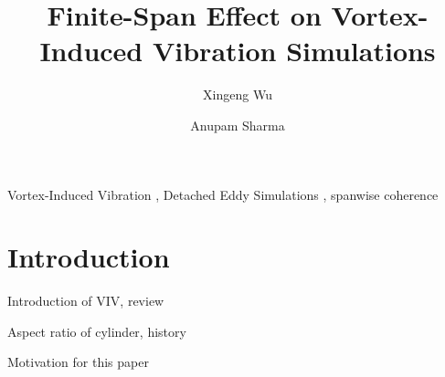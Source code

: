 \documentclass[12pt,preprint]{elsarticle}
\begin{document}
\begin{frontmatter}



\title{Finite-Span Effect on Vortex-Induced Vibration Simulations}


\author[1]{Xingeng Wu}
\author[2]{Anupam Sharma}

\address{Department of Aerospace Engineering, Iowa State University, Ames,
Iowa, 50011}



\begin{keyword}
  Vortex-Induced Vibration \sep 
  Detached Eddy Simulations \sep 
  spanwise coherence
\end{keyword}

\end{frontmatter}


\section{Introduction}
\label{sec:intro}
%
Introduction of VIV, review

Aspect ratio of cylinder, history

Motivation for this paper
\end{document}
